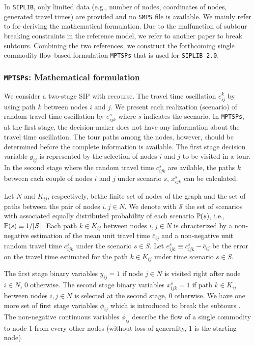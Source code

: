In \texttt{SIPLIB}, only limited data (e.g., number of nodes, coordinates of nodes, generated travel times) are provided and no \texttt{SMPS} file is available. We mainly refer to \cite{journal:PGM2017} for deriving the mathematical formulation. Due to the malfunction of subtour breaking constraints in the reference model, we refer to another paper \cite{journal:LSD1990} to break subtours. Combining the two references, we construct the forthcoming single commodity flow-based formulation \texttt{MPTSPs} that is used for \texttt{SIPLIB 2.0}. 
\subsubsection{\texttt{MPTSPs}: Mathematical formulation}
We consider a two-stage SIP with recourse. The travel time oscillation $e_{ij}^k$ by using path $k$ between nodes $i$ and $j$. We present each realization (scenario) of random travel time oscillation by $e_{ijk}^{s}$ where $s$ indicates the scenario. In \texttt{MPTSPs}, at the first stage, the decision-maker does not have any information about the travel time oscillation. The tour paths among the nodes, however, should be determined before the complete information is available. The first stage decision variable $y_{ij}$ is represented by the selection of nodes $i$ and $j$ to be visited in a tour. In the second stage where the random travel time $c_{ijk}^{s}$ are avilable, the paths $k$ between each couple of nodes $i$ and $j$ under scenario $s$, $x_{ijk}^{s}$ can be calculated. 

Let $N$ and $K_{ij}$, respectively, bethe finite set of nodes of the graph and the set of paths between the pair of nodes $i,j\in N$. We denote with $\mathcal{S}$ the set of scenarios with associated equally distributed probability of each scenario $\operatorname*{\mathbb{P}}(s)$, i.e., $\operatorname*{\mathbb{P}}(s)\equiv 1/|\mathcal{S}|$. Each path $k\in K_{ij}$ between nodes $i,j\in N$ is chracterized by a non-negative estimation of the mean unit travel time $\bar{c}_{ij}$ and a non-negative unit random travel time $c_{ijk}^{s}$ under the scenario $s\in S$. Let $e_{ijk}^{s}\equiv c_{ijk}^{s}-\bar{c}_{ij}$ be the error on the travel time estimated for the path $k\in K_{ij}$ under time scenario $s\in S$.

The first stage binary variables $y_{ij}=1$ if node $j\in N$ is visited right after node $i\in N$, 0 otherwise. The second stage binary variables $x_{ijk}^{s}=1$ if path $k\in K_{ij}$ between nodes $i,j\in N$ is selected at the second stage, 0 otherwise. We have one more set of first stage variables $\phi_{ij}$ which is introduced to break the subtours \cite{journal:LSD1990}. The non-negative continuous variables $\phi_{ij}$ describe the flow of a single commodity to node 1 from every other nodes (without loss of generality, 1 is the starting node). 

